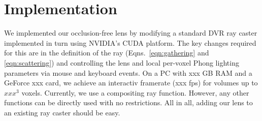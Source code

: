 \section{Implementation}
\label{sec:implem}
%
We implemented our occlusion-free lens by modifying a standard DVR ray caster implemented in turn using NVIDIA's CUDA platform. The key changes required for this are in the definition of the ray (Eqns.~\ref{eqn:gathering} and \ref{eqn:scattering}) and controlling the lens and local per-voxel Phong lighting parameters via mouse and keyboard events. On a PC with xxx GB RAM and a GeForce xxx card, we achieve an interactiv framerate (xxx fps) for volumes up to $xxx^3$ voxels. Currently, we use a compositing ray function. However, any other functions can be directly used with no restrictions. All in all, adding our lens to an existing ray caster should be easy.

